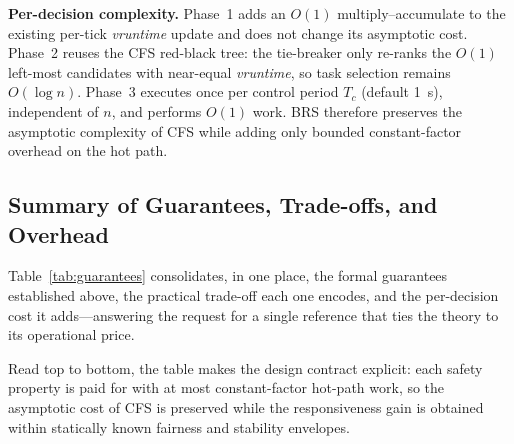 \textbf{Per-decision complexity.} Phase~1 adds an $O(1)$ multiply--accumulate to the existing per-tick \textit{vruntime} update and does not change its asymptotic cost. Phase~2 reuses the CFS red-black tree: the tie-breaker only re-ranks the $O(1)$ left-most candidates with near-equal \textit{vruntime}, so task selection remains $O(\log n)$. Phase~3 executes once per control period $T_c$ (default \SI{1}{\second}), independent of $n$, and performs $O(1)$ work. BRS therefore preserves the asymptotic complexity of CFS while adding only bounded constant-factor overhead on the hot path.

\subsection{Summary of Guarantees, Trade-offs, and Overhead}
\label{subsec:guarantee-summary}
Table~\ref{tab:guarantees} consolidates, in one place, the formal guarantees established above, the practical trade-off each one encodes, and the per-decision cost it adds---answering the request for a single reference that ties the theory to its operational price.

\begin{table}[t]
\centering
\caption{Consolidated view of BRS's formal guarantees, the practical trade-off each encodes, and its computational overhead.}
\label{tab:guarantees}
\end{table}

Read top to bottom, the table makes the design contract explicit: each safety property is paid for with at most constant-factor hot-path work, so the asymptotic cost of CFS is preserved while the responsiveness gain is obtained within statically known fairness and stability envelopes.